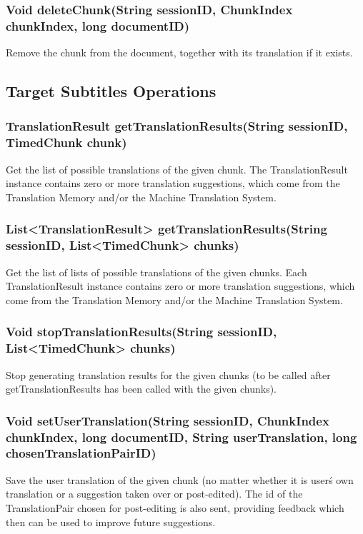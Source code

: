 
\subsubsection{Void deleteChunk(String sessionID, ChunkIndex chunkIndex, long documentID)}
Remove the chunk from the document, together with its translation if it exists.

\subsection{Target Subtitles Operations}

\subsubsection{TranslationResult getTranslationResults(String sessionID, TimedChunk chunk)}
Get the list of possible translations of the given chunk.
The TranslationResult instance contains zero or more translation suggestions, which come from the Translation Memory and/or the Machine Translation System.

\subsubsection{List<TranslationResult> getTranslationResults(String sessionID, List<TimedChunk> chunks)}
Get the list of lists of possible translations of the given chunks.
Each TranslationResult instance contains zero or more translation suggestions, which come from the Translation Memory and/or the Machine Translation System.

\subsubsection{Void stopTranslationResults(String sessionID, List<TimedChunk> chunks)}
Stop generating translation results for the given chunks
(to be called after getTranslationResults has been called
with the given chunks).

\subsubsection{Void setUserTranslation(String sessionID, ChunkIndex chunkIndex, long documentID, String userTranslation, long chosenTranslationPairID)}
Save the user translation of the given chunk (no matter whether it is user\'s own translation or a suggestion taken over or post-edited).
The id of the TranslationPair chosen for post-editing is also sent, providing feedback which then can be used to improve future suggestions.

